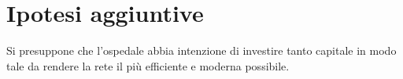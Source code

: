 \section{Ipotesi aggiuntive}
\hspace{24pt}
Si presuppone che l'ospedale abbia intenzione di investire tanto capitale in modo tale da rendere
la rete il più efficiente e moderna possibile.